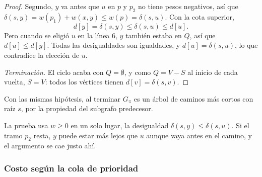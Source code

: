 \documentclass[11pt,letterpaper]{article}
\begin{document}
\begin{proof}
  Segundo, $y$ va antes que $u$ en $p$ y $p_2$ no tiene pesos
  negativos, así que $\delta(s, y) = w(p_1) + w(x, y) \le w(p) =
  \delta(s, u)$. Con la cota superior,
  \[
    d[y] = \delta(s, y) \le \delta(s, u) \le d[u] .
  \]
  Pero cuando se eligió $u$ en la línea 6, $y$ también estaba en $Q$,
  así que $d[u] \le d[y]$. Todas las desigualdades son igualdades, y
  $d[u] = \delta(s, u)$, lo que contradice la elección de $u$.

  \textit{Terminación.} El ciclo acaba con $Q = \emptyset$, y como
  $Q = V - S$ al inicio de cada vuelta, $S = V$: todos los vértices
  tienen $d[v] = \delta(s, v)$.
\end{proof}

\begin{corolario}\label{cor:dijkstra-arbol}
  Con las mismas hipótesis, al terminar $G_\pi$ es un árbol de caminos
  más cortos con raíz $s$, por la propiedad del subgrafo predecesor.
\end{corolario}

La prueba usa $w \ge 0$ en un solo lugar, la desigualdad
$\delta(s, y) \le \delta(s, u)$. Si el tramo $p_2$ resta, $y$ puede
estar más lejos que $u$ aunque vaya antes en el camino, y el
argumento se cae justo ahí.

\subsubsection*{Costo según la cola de prioridad}
\end{document}
